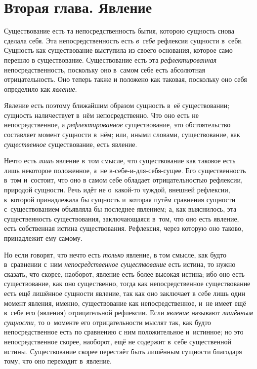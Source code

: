 \chapter[{\em Вторая глава} Явление]{Вторая глава. Явление}

Существование есть та непосредственность бытия,
которою сущность снова сделала себя. Эта непосредственность есть
{\em в~себе} рефлексия сущности в~себя. Сущность как
существование выступила из своего основания, которое само перешло в
существование. Существование есть эта
{\em рефлектированная} непосредственность, поскольку
оно в~самом себе есть абсолютная отрицательность. Оно теперь также и
положено как таковая, поскольку оно себя определило как
{\em явление}.

Явление есть поэтому ближайшим образом сущность в~её существовании; сущность
наличествует в~нём непосредственно. Что оно есть не непосредственное, а
{\em рефлектированное} существование, это
обстоятельство составляет момент сущности в~нём; или, иными словами,
существование, как {\em существенное} существование,
есть явление.

Нечто есть {\em лишь} явление в~том смысле, что
существование как таковое есть лишь некоторое положенное, а~не
в-себе-и-для-себя-сущее. Его существенность в~том и~состоит, что оно в
самом себе обладает отрицательностью рефлексии, природой сущности. Речь
идёт не о~какой-то чуждой, внешней рефлексии, к~которой принадлежала бы
сущность и~которая путём сравнения сущности с~существованием объявляла бы
последнее явлением; а, как выяснилось, эта существенность существования,
заключающаяся в~том, что оно есть явление, есть собственная истина
существования. Рефлексия, через которую оно таково, принадлежит ему самому.

Но если говорят, что нечто есть {\em только} явление, в
том смысле, как будто в~сравнении с~ним
{\em непосредственное существование} есть истина, то
нужно сказать, что скорее, наоборот, явление есть более высокая истина; ибо
оно есть существование, как оно существенно, тогда как непосредственное
существование есть ещё лишённое сущности явление, так как оно заключает в
себе лишь один момент явления, именно, существование как непосредственное,
и~не имеет ещё в~себе его (явления) отрицательной рефлексии. Если
{\em явление} называют
{\em лишённым сущности,} то о~моменте его
отрицательности мыслят так, как будто непосредственное есть по сравнению с
ним положительное и~истинное; но это непосредственное скорее, наоборот, ещё
не содержит в~себе существенной истины. Существование скорее перестаёт быть
лишённым сущности благодаря тому, что оно переходит в~явление.

